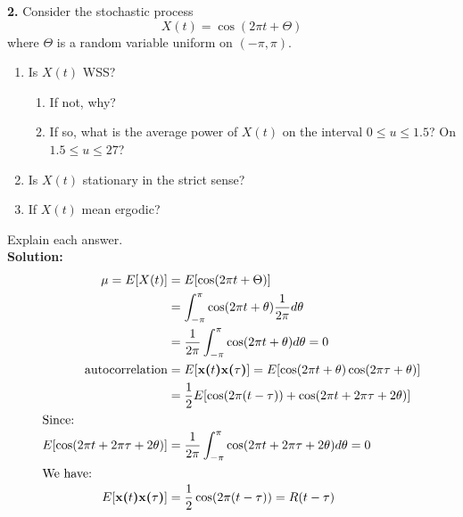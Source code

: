\textbf{2.} Consider the stochastic process
  $$X(t)= \cos (2 \pi t + \Theta  )$$
  where $\Theta$ is  a random variable uniform on $(-\pi, \pi)$.
  \begin{enumerate}
  \item Is $X(t)$ WSS?
    \begin{enumerate}
    \item If not, why?
    \item If so, what is the average power of $X(t)$ on the interval $0\leq u \leq 1.5$? On $1.5\leq u \leq 27$?
    \end{enumerate}
  \item Is $X(t)$ stationary in the strict sense?
  \item If $X(t)$ mean ergodic?
  \end{enumerate}
  Explain each answer. \\

  \textbf{Solution:}\\

  \begin{align*}
    \mu = E[X(t)] & = E[\cos (2 \pi t + \Theta  )] \\
                  & = \int_{-\pi}^{\pi} \cos (2 \pi t + \theta  ) \dfrac{1}{2 \pi} d\theta \\
                  & = \dfrac{1}{2 \pi} \int_{-\pi}^{\pi} \cos (2 \pi t + \theta  ) d\theta  = 0 \\
    \text{autocorrelation} & = E[\textbf{x($t$)x($\tau$)}]
                             = E[\cos (2 \pi t + \theta  )\cos (2 \pi \tau + \theta  )] \\
                  & = \frac{1}{2}E[\cos (2 \pi (t - \tau)) + \cos (2\pi t + 2\pi \tau + 2\theta)]\\
    \shortintertext{Since:}
    E[\cos (2\pi t + 2\pi \tau + 2\theta)]
                  & = \dfrac{1}{2\pi} \int_{-\pi}^{\pi} \cos (2\pi t + 2\pi \tau + 2\theta) d\theta = 0 \\
    \shortintertext{We have:}
    E[\textbf{x($t$)x($\tau$)}] & = \dfrac{1}{2}\cos(2\pi (t - \tau)) = R(t - \tau)
  \end{align*}

